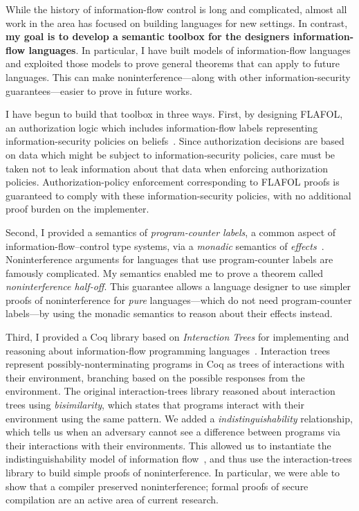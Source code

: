 \documentclass{article}
\theoremstyle{definition}
\begin{document}
While the history of information-flow control is long and complicated, almost all work in the area has focused on building languages for new settings.
In contrast, \textbf{my goal is to develop a semantic toolbox for the designers information-flow languages}.
In particular, I have built models of information-flow languages and exploited those models to prove general theorems that can apply to future languages.
This can make noninterference---along with other information-security guarantees---easier to prove in future works.

I have begun to build that toolbox in three ways.
First, by designing FLAFOL, an authorization logic which includes information-flow labels representing information-security policies on beliefs~\citep{HirschACAT20}.
Since authorization decisions are based on data which might be subject to information-security policies, care must be taken not to leak information about that data when enforcing authorization policies.
Authorization-policy enforcement corresponding to FLAFOL proofs is guaranteed to comply with these information-security policies, with no additional proof burden on the implementer.

Second, I provided a semantics of \emph{program-counter labels}, a common aspect of information-flow--control type systems, via a \emph{monadic} semantics of \emph{effects}~\citep{HirschC21}.
Noninterference arguments for languages that use program-counter labels are famously complicated.
My semantics enabled me to prove a theorem called \emph{noninterference half-off}.
This guarantee allows a language designer to use simpler proofs of noninterference for \emph{pure} languages---which do not need program-counter labels---by using the monadic semantics to reason about their effects instead.

Third, I provided a Coq library based on \emph{Interaction Trees} for implementing and reasoning about information-flow programming languages~\citep{SilverHHCZ22}.
Interaction trees represent possibly-nonterminating programs in Coq as trees of interactions with their environment, branching based on the possible responses from the environment.
The original interaction-trees library reasoned about interaction trees using \emph{bisimilarity}, which states that programs interact with their environment using the same pattern.
We added a \emph{indistinguishability} relationship, which tells us when an adversary cannot see a difference between programs via their interactions with their environments.
This allowed us to instantiate the indistinguishability model of information flow~\citep{SabelfeldS99}, and thus use the interaction-trees library to build simple proofs of noninterference.
In particular, we were able to show that a compiler preserved noninterference; formal proofs of secure compilation are an active area of current research.
\end{document}
